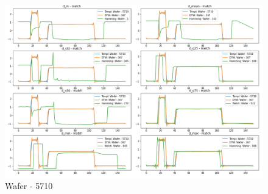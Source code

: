 \documentclass[phd,black, hidelinks]{PrincetonThesis}
\begin{document}
\begin{figure}[htbp]
\centering
\includegraphics[width=.9\linewidth]{./img/dtw_comp_res/Wafer_5710.png}
\caption{\label{fig:orgbc531d0}Wafer - 5710}
\end{figure}



\end{document}
